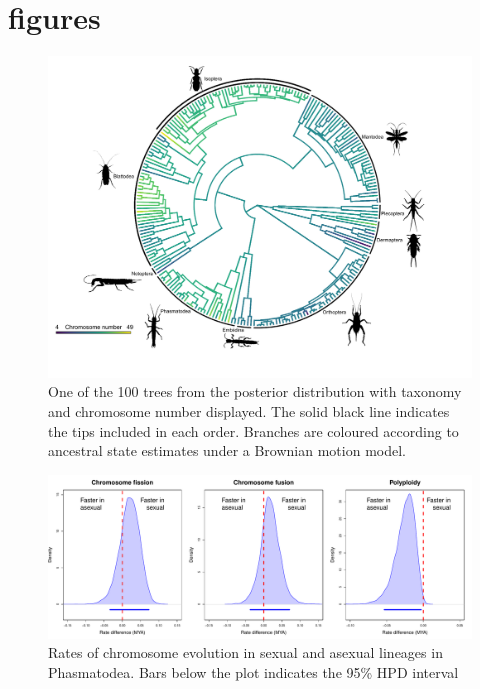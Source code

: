 \section{figures}%

\begin{figure}[h]
\centering \includegraphics[width=1\textwidth]{figures/phylogenetic_tree.pdf}
\caption{
One of the 100 trees from the posterior distribution with taxonomy and chromosome number displayed. The solid black line indicates the tips included in each order. Branches are coloured according to ancestral state estimates under a Brownian motion model. 
}
\label{fig:phyloplot}
\end{figure}

\newpage
\begin{figure}
\centering \includegraphics[width=.7\textwidth]{figures/phasmatodea_sex_asex_plot.pdf}
\caption{Rates of chromosome evolution in sexual and asexual lineages in Phasmatodea. Bars below the plot indicates the 95\% HPD interval}
\label{fig:phas.plot}
\end{figure}

